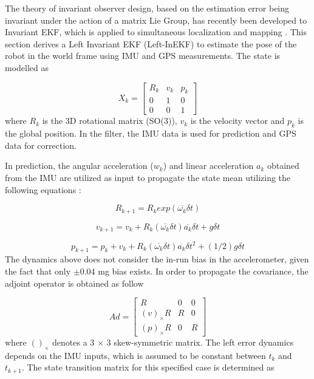 

The theory of invariant observer design, based on the estimation error being invariant under the action of a matrix Lie Group, has recently been developed to Invariant EKF, which is applied to simultaneous localization and mapping \cite{hartley2018contact}. This section derives a Left Invariant EKF (Left-InEKF) to estimate the pose of the robot in the world frame using IMU and GPS measurements. The state is modelled as 

\begin{equation}
    X_{k} = 
    \begin{bmatrix}
    R_{k} & v_{k} & p_{k} \\
    0 & 1 & 0 \\
    0 & 0 & 1
    \end{bmatrix}
\end{equation}
where $R_{k}$ is the 3D rotational matrix (SO(3)), $v_{k}$ is the velocity vector and $p_{k}$ is the global position. In the filter, the IMU data is used for prediction and GPS data for correction.

In prediction, the angular acceleration ($w_{k}$) and linear acceleration $a_{k}$ obtained from the IMU are utilized as input to propagate the state mean utilizing the following equations \cite{hartley2018contact}:

\begin{equation}
    R_{k+1}=R_{k}exp(\overline{\omega_{k}}\delta t)
\end{equation}

\begin{equation}
    v_{k+1}=v_{k}+R_{k}(\overline{\omega_{k}}\delta t)\overline{a_{k}}\delta t+g \delta t
\end{equation}

\begin{equation}
    p_{k+1}=p_{k}+v_{k}+R_{k}(\overline{\omega_{k}}\delta t)\overline{a_{k}}\delta t^{2}+(1/2)g \delta t
\end{equation}
The dynamics above does not consider the in-run bias in the accelerometer, given the fact that only $\pm$0.04 mg bias exists. In order to propagate the covariance, the adjoint operator is obtained as follow \cite{hartley2018contact}


\begin{equation}
    Ad = 
    \begin{bmatrix}
    R & 0 & 0   \\
    (v)_{\times}R & R & 0  \\
    (p)_{\times}R & 0 & R 
    \end{bmatrix}
\end{equation}
where $()_{\times}$ denotes a 3 $\times$ 3 skew-symmetric matrix. 
The left error dynamics depends on the IMU inputs, which is assumed to be constant between $t_{k}$ and $t_{k+1}$. The state transition matrix for this specified case is determined as 

